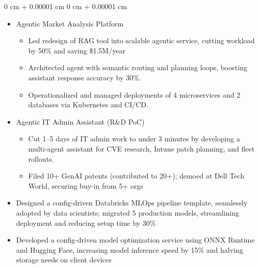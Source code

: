 \documentclass[10pt, letterpaper]{article}
\newenvironment{highlights}{
    \begin{itemize}[
        topsep=0.10 cm,
        parsep=0.10 cm,
        partopsep=0pt,
        itemsep=0pt,
        leftmargin=0 cm + 10pt
    ]
}{
    \end{itemize}
} %
\newenvironment{onecolentry}{
    \begin{adjustwidth}{
        0 cm + 0.00001 cm
    }{
        0 cm + 0.00001 cm
    }
}{
    \end{adjustwidth}
} %
\begin{document}
\begin{onecolentry}
\begin{highlights}
        \item Agentic Market Analysis Platform
          \begin{highlights}
            \item Led redesign of RAG tool into scalable agentic service, cutting workload by 50\% and saving \$1.5M/year
            \item Architected agent with semantic routing and planning loops, boosting assistant response accuracy by 30\%.
            \item Operationalized and managed deployments of 4 microservices and 2 databases via Kubernetes and CI/CD.
          \end{highlights}
    
        \item Agentic IT Admin Assistant (R\&D PoC)
          \begin{highlights}
            \item Cut 1–5 days of IT admin work to under 3 minutes by developing a multi-agent assistant for CVE research, Intune patch planning, and fleet rollouts.
            \item Filed 10+ GenAI patents (contributed to 20+); demoed at Dell Tech World, securing buy-in from 5+ orgs
          \end{highlights}
        \item Designed a config-driven Databricks MLOps pipeline template, seamlessly adopted by data scientists; migrated 5 production models, streamlining deployment and reducing setup time by 30\%
        \item Developed a config-driven model optimization service using ONNX Runtime and Hugging Face, increasing model inference speed by 15\% and halving storage needs on client devices
    \end{highlights}
  \end{onecolentry}
  \vspace{0.2cm}
\end{document}
